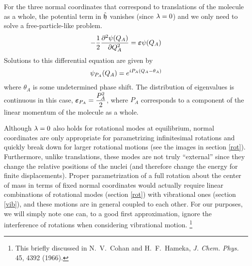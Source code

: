 \documentclass[11pt]{article}
\begin{document}
For the three normal coordinates that correspond to translations of the
molecule as a whole, the potential term in $\hat{\mathfrak{h}}$ vanishes (since
$\lambda=0$) and we only need to solve a free-particle-like problem.
\begin{align}
-\dfrac{1}{2}
     \dfrac{ \partial^{2} \psi(Q_A) }{\partial Q_A ^{2}}
=
    \bm\varepsilon
    \psi(Q_A)
\end{align}
Solutions to this differential equation are given by
\begin{align}
    \psi_{P_A}(Q_A)
=
    e^{iP_A(Q_A-\theta_A)}
\end{align}
where $\theta_A$ is some undetermined phase shift. The distribution of
eigenvalues is continuous in this case, $\bm\varepsilon_{P_A}=\dfrac{P_A^2}{2}$, where $P_A$
corresponds to a component of the linear momentum of the molecule as a whole.

Although $\lambda=0$ also holds for rotational modes at equilibrium, normal
coordinates are only appropriate for parametrizing infinitesimal rotations and
quickly break down for larger rotational motions (see the images in section
\ref{rot}). Furthermore, unlike translations, these modes are not truly
``external'' since they change the relative positions of the nuclei (and
therefore change the energy for finite displacements). Proper parametrization
of a full rotation about the center of mass in terms of fixed normal
coordinates would actually require linear combinations of rotational modes
(section \ref{rot}) with vibrational ones (section \ref{vib}), and these
motions are in general coupled to each other. For our purposes, we will simply
note one can, to a good first approximation, ignore the interference of
rotations when considering vibrational motion. \footnote{This briefly discussed
in N.\ V.\ Cohan and H.\ F.\ Hameka, {\it J. Chem. Phys.} 45, 4392 (1966).}
\end{document}
